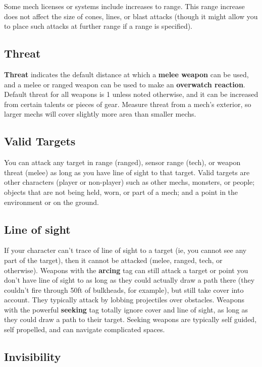 Some mech licenses or systems include increases to range. This range increase does not affect the size of cones, lines, or blast attacks (though it might allow you to place such attacks at further range if a range is specified).


\subsection{Threat}
\textbf{Threat} indicates the default distance at which a \textbf{melee weapon} can be used, and a melee or
ranged weapon can be used to make an \textbf{overwatch reaction}. Default threat for all weapons is 1
unless noted otherwise, and it can be increased from certain talents or pieces of gear. Measure
threat from a mech's exterior, so larger mechs will cover slightly more area than smaller mechs.

\subsection{Valid Targets}

You can attack any target in range (ranged), sensor range (tech), or weapon threat (melee) as long as you have line of sight to that target. Valid targets are other characters (player or non-player) such as other mechs, monsters, or people; objects that are not being held, worn, or part of a mech; and a point in the environment or on the ground.

\subsection{Line of sight}

If your character can't trace of line of sight to a target (ie, you cannot see any part of the target), then it cannot be attacked (melee, ranged, tech, or otherwise). Weapons with the \textbf{arcing} tag can still attack a target or point you don't have line of sight to as long as they could actually draw a path there (they couldn't fire through 50ft of bulkheads, for example), but still take cover into account. They typically attack by lobbing projectiles over obstacles. Weapons with the powerful \textbf{seeking} tag totally ignore cover and line of sight, as long as they could draw a path to their target. Seeking weapons are typically self guided, self propelled, and can navigate complicated spaces.

\subsection{Invisibility}

